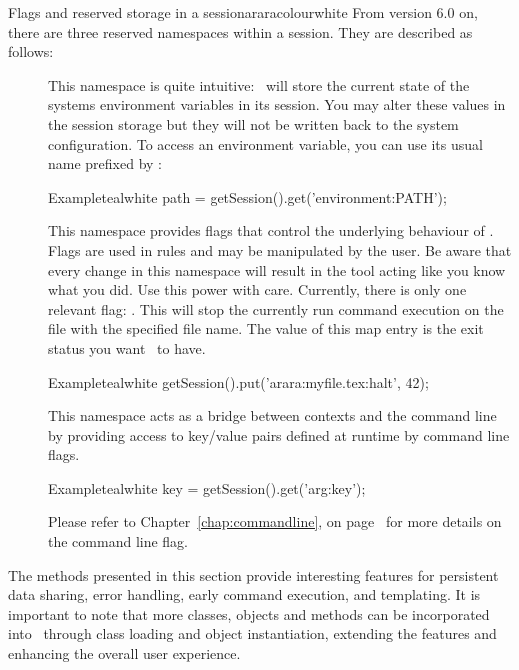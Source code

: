 \begin{messagebox}{Flags and reserved storage in a session}{araracolour}{\icok}{white}
From version 6.0 on, there are three reserved namespaces within a session. They are described as follows:

\begin{description}
\item[{}] This namespace is quite intuitive: \arara\ will store the current state of the systems environment variables in its session. You may alter these values in the session storage but they will not be written back to the system configuration. To access an environment variable, you can use its usual name prefixed by :

\begin{codebox}{Example}{teal}{\icnote}{white}
path = getSession().get('environment:PATH');
\end{codebox}

\item[{}] This namespace provides flags that control the underlying behaviour of \arara. Flags are used in rules and may be manipulated by the user. Be aware that every change in this namespace will result in the tool acting like you know what you did. Use this power with care. Currently, there is only one relevant flag: . This will stop the currently run command execution on the file with the specified file name. The value of this map entry is the exit status you want \arara\ to have.

\begin{codebox}{Example}{teal}{\icnote}{white}
getSession().put('arara:myfile.tex:halt', 42);
\end{codebox}

\item[{}] This namespace acts as a bridge between contexts and the command line by providing access to key/value pairs defined at runtime by  command line flags.

\begin{codebox}{Example}{teal}{\icnote}{white}
key = getSession().get('arg:key');
\end{codebox}

Please refer to Chapter~\ref{chap:commandline}, on page~\pageref{chap:commandline} for more details on the  command line flag.

\end{description}
\end{messagebox}

The methods presented in this section provide interesting features for persistent data sharing, error handling, early command execution, and templating. It is important to note that more classes, objects and methods can be incorporated into \arara\ through class loading and object instantiation, extending the features and enhancing the overall user experience.
